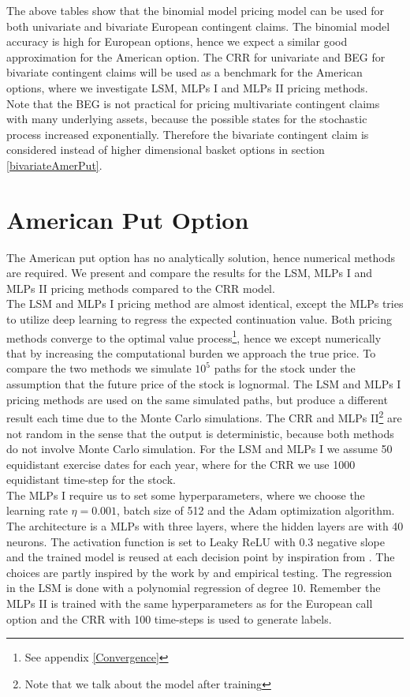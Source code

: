The above tables show that the binomial model pricing model can be used for both univariate and bivariate European contingent claims. The binomial model accuracy is high for European options, hence we expect a similar good approximation for the American option. The CRR for univariate and BEG for bivariate contingent claims will be used as a benchmark for the American options, where we investigate LSM, MLPs I and MLPs II pricing methods. \\

Note that the BEG is not practical for pricing multivariate contingent claims with many underlying assets, because the possible states for the stochastic process increased exponentially. Therefore the bivariate contingent claim is considered instead of higher dimensional basket options in section \ref{bivariateAmerPut}.
\section{American Put Option}
The American put option has no analytically solution, hence numerical methods are required. We present and compare the results for the LSM, MLPs I and MLPs II pricing methods compared to the CRR model.\\

The LSM and MLPs I pricing method are almost identical, except the MLPs tries to utilize deep learning to regress the expected continuation value. Both pricing methods converge to the optimal value process\footnote{See appendix \ref{Convergence}}, hence we except numerically that by increasing the computational burden we approach the true price. To compare the two methods we simulate $10^5$ paths for the stock under the assumption that the future price of the stock is lognormal. The LSM and MLPs I pricing methods are used on the same simulated paths, but produce a different result each time due to the Monte Carlo simulations. The CRR and MLPs II\footnote{Note that we talk about the model after training} are not random in the sense that the output is deterministic, because both methods do not involve Monte Carlo simulation. For the LSM and MLPs I we assume 50 equidistant exercise dates for each year, where for the CRR we use 1000 equidistant time-step for the stock.  \\

The MLPs I require us to set some hyperparameters, where we choose the learning rate $\eta=0.001$, batch size of 512 and the Adam optimization algorithm. The architecture is a MLPs with three layers, where the hidden layers are with 40 neurons. The activation function is set to Leaky ReLU with 0.3 negative slope and the trained model is reused at each decision point by inspiration from \parencite{Lelong19}. The choices are partly inspired by the work by \parencite{Lelong19} and empirical testing. The regression in the LSM is done with a polynomial regression of degree 10. Remember the MLPs II is trained with the same hyperparameters as for the European call option and the CRR with 100 time-steps is used to generate labels.\\

